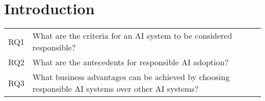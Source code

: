 \section{Introduction}
\label{sec:Introduction}





\begin{table}[h]
    \centering
    \begin{tabular}{cp{}}
        RQ1 & What are the criteria for an AI system to be considered responsible? \\
        RQ2 & What are the antecedents for responsible AI adoption? \\
        RQ3 & What business advantages can be achieved by choosing responsible AI systems over other AI systems? \\
    \end{tabular}
\end{table}



